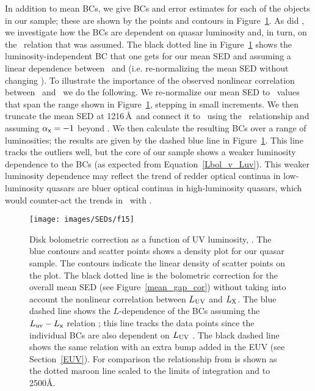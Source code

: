 In addition to mean BCs, we give BCs and error estimates for each of the objects in our sample; these are shown by the points and contours in Figure~\ref{bc_v_lum}.  As did \citet{Marconi:2004}, we investigate how the BCs are dependent on quasar luminosity and, in turn, on the \luvaox\ relation that was assumed.  The black dotted line in Figure~\ref{bc_v_lum} shows the luminosity-independent BC that one gets for our mean SED and assuming a linear dependence between \luv\ and \lx (i.e. re-normalizing the mean SED without changing \aox).  To illustrate the importance of the observed nonlinear correlation between \luv\ and \lx\ we do the following.  We re-normalize our mean SED to \ltwofive\ values that span the range shown in Figure~\ref{bc_v_lum}, stepping in small increments.  We then truncate the mean SED at 1216\,\AA\ and connect it to \twohundredev\ using the \luvaox\ relationship and assuming $\alpha_{\rm x}=-1$ beyond \twohundredev.  We then calculate the resulting BCs over a range of luminosities; the results are given by the dashed blue line in Figure~\ref{bc_v_lum}.  
This line tracks the outliers well, but the core of our sample shows a weaker luminosity dependence to the BCs (as expected from Equation~\ref{Lbol_v_Luv}).
This weaker luminosity dependence may reflect the trend of redder optical continua in low-luminosity quasars are bluer optical continua in high-luminosity quasars, which would counter-act the trends in \aox\ with \luv.

\begin{figure}[t]
\centering
 \texttt{[image: images/SEDs/f15]}
 \caption[Bolometric correction vs. luminosity]{Disk bolometric correction as a function of UV luminosity, \ltwofive.  
The blue contours and scatter points shows a density plot for our quasar sample.  The contours indicate the linear density of scatter points on the plot.
The black dotted line is the bolometric correction for the overall mean SED (see Figure~\ref{mean_gap_cor}) without taking into account the nonlinear correlation between $L_{\rm UV}$ and $L_{\rm X}$. The blue dashed line shows the $L$-dependence of the BCs assuming the $L_{{\rm uv}}-L_{{\rm x}}$ relation \citep{Steffen:2006}; this line tracks the data points since the individual BCs are also dependent on $L_{\rm UV}$ .  The black dashed line shows the same relation with an extra bump added in the EUV (see Section~\ref{EUV}).   For comparison the relationship from \citet{Marconi:2004} is shown as the dotted maroon line scaled to the limits of integration and to 2500\AA.}
 \label{bc_v_lum}
\end{figure}

